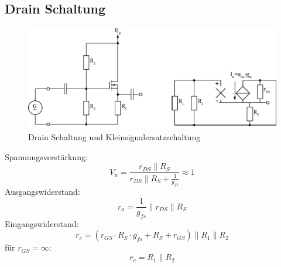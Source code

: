 



\subsection{Drain Schaltung}
\begin{figure}[h!]
	\centering
	\includegraphics[width = \linewidth]{../fig/fet_drain.pdf}
	\caption{Drain Schaltung und Kleinsignalersatzschaltung}
	\label{fet:drainschaltung}
\end{figure}
\noindent
Spannungsverstärkung:
\[
	V_u = \frac{r_{DS} \parallel R_S}{r_{DS} \parallel R_S + \frac{1}{g_{fs}}} \approx 1
\]
Ausgangswiderstand:
\[
	r_a = \frac{1}{g_{fs}} \parallel r_{DS} \parallel R_S
\]
Eingangswiderstand:
\[
	r_e = (r_{GS} \cdot R_S \cdot g_{fs} + R_S + r_{GS}) \parallel R_1 \parallel R_2
\]
für $r_{GS} = \infty$:
\[
	r_e = R_1 \parallel R_2
\]

